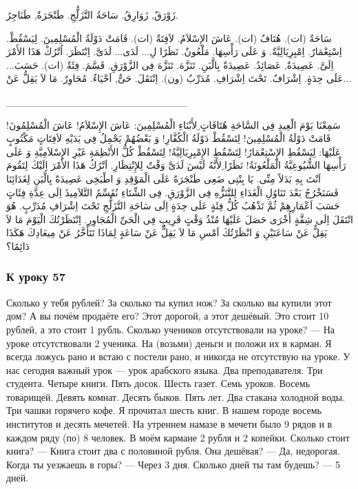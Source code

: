 \documentclass[a5paper]{article}
\begin{document}
زَوْرَقٌ, زَوَارِقُ. سَاحَةُ التَّزَلُّجِ. طَنْجَرَةٌ, طَنَاجِرُ. 

سَاحَةٌ (ات). هُتَافٌ (ات). عَاشَ الإِسْلاَمُ. لاَفِتَةٌ (ات). قَامَتْ دَوْلَةُ الْمُسْلِمِينَ. لِيَسْقُطْ. اِسْتِعْمَارٌ. اِمْبِرِيَالِيَّةٌ. وَ عَلَى رَأْسِهَا. مَلْعُونٌ. نَظَرًا لِ... لَدَى... لَدَىَّ. اِنْتَظَرَ. اُتْرُكْ هَذَا الأَمْرَ اِلَىَّ. عَصِيدَةٌ, عَصَائِدُ. عَصِيدَةٌ بِالَّبَنِ. تَنَزَّهَ. تَنَزَّهَ فِى الزَّوْرَقِ. قَسَّمَ. فِئَةٌ (ات). حَسَبَ... عَلَى حِدَةٍ. اِشْرَافٌ. تَحْتَ اِشْرَافِ. مُدَرِّبٌ (ون). اِنْتَقَلَ. حَىٌّ, اَحْيَاءٌ. مُجَاوِرٌ. مَا لاَ يَقِلُّ عَنْ...

\_\_\_\_\_\_\_\_\_\_\_\_\_\_\_\_\_\_\_\_\_\_\_\_\_

سَمِعْنَا يَوْمَ الْعِيدِ فِى السَّاحَةِ هُتَافَاتٍ ِلأَبْنَاءِ الْمُسْلِمِينَ: عَاشَ الإِسْلاَمُ! عَاشَ الْمُسْلِمُونَ! قَامَتْ دَوْلَةُ الْمُسْلِمِينَ! لِتَسْقُطْ دَوْلَةُ الْكُفَّارِ! وَ بَعْضُهُمْ يَحْمِلُ فِى يَدَيْهِ لاَفِتَاتٍ مَكْتُوبٍ عَلَيْهَا: لِيَسْقُطِ الإِسْتِعْمَارُ! لِتَسْقُطِ الإِمْبِرِيَالِيَّةُ! لِتَسْقُطْ كُلُّ الأَنْظِمَةِ غَيْرِ الإِسْلاَمِيَّةِ وَ عَلَى رَأْسِهَا الشُّيُوعِيَّةُ الْمَلْعُونَةُ! نَظَرًا ِلأَنَّهُ لَيْسَ لَدَىَّ وَقْتٌ لِلإِنْتِظَارِ. اَتْرُكُ هَذَا الأَمْرَ اِلَيْكَ لِتَقُومَ اَنْتَ بِهِ بَدَلاً مِنِّى. يَا بِنْتِى ضَعِى طَنْجَرَةً عَلَى الْمَوْقِدِ وَ اطْبَخِى عَصِيدَةً بِالَّبَنِ لِغَدَائِنَا فَسَنَخْرُجُ بَعْدَ تَنَاوُلِ الْغَدَاءِ لِلتَّنَزُّهِ فِى الزَّوْرَقِ. فِى الشِّتَاءِ نُقَسِّمُ التَّلاَمِيذَ اِلَى عِدَّةِ فِئَاتٍ حَسَبَ اَعْمَارِهِمْ ثُمَّ تَذْهُبُ كُلُّ فِئَةٍ عَلَى حِدَةٍ اِلَى سَاحَةِ التَّزَلُّجِ تَحْتَ اِشْرَافِ مُدَرِّبٍ. هُوَ انْتَقَلَ اِلَى شِقَّةٍ أُخْرَى حَصَلَ عَلَيْهَا مُنْذُ وَقْتٍ قَرِيبٍ فِى الْحَىِّ الْمُجَاوِرِ. اِنْتَظَرْتُكَ الْيَوْمَ مَا لاَ يَقِلُّ عَنْ سَاعَتَيْنِ وَ انْظَرْتُكَ اَمْسِ مَا لاَ يَقِلُّ عَنْ سَاعَةٍ لِمَاذَا تَتَأَخَّرُ عَنْ مِيعَادِكَ هَكَذَا دَائِمًا؟

\subsubsection{К уроку 57}
Сколько у тебя рублей? За сколько ты купил нож? За сколько вы купили этот дом? А вы почём продаёте его? Этот дорогой, а этот дешёвый. Это стоит 10 рублей, а это стоит 1 рубль. Сколько учеников отсутствовали на уроке? — На уроке отсутствовали 2 ученика. На (возьми) деньги и положи их в карман. Я всегда ложусь рано и встаю с постели рано, и никогда не отсутствую на уроке. У нас сегодня важный урок — урок арабского языка. Два преподавателя. Три студента. Четыре книги. Пять досок. Шесть газет. Семь уроков. Восемь товарищей. Девять комнат. Десять быков. Пять лет. Два стакана холодной воды. Три чашки горячего кофе. Я прочитал шесть книг. В нашем городе восемь институтов и десять мечетей. На утреннем намазе в мечети было 9 рядов и в каждом ряду (по) 8 человек. В моём кармане 2 рубля и 2 копейки. Сколько стоит книга? — Книга стоит два с половиной рубля. Она дешёвая? — Да, недорогая. Когда ты уезжаешь в горы? — Через 3 дня. Сколько дней ты там бу­дешь? — 5 дней.
\end{document}
